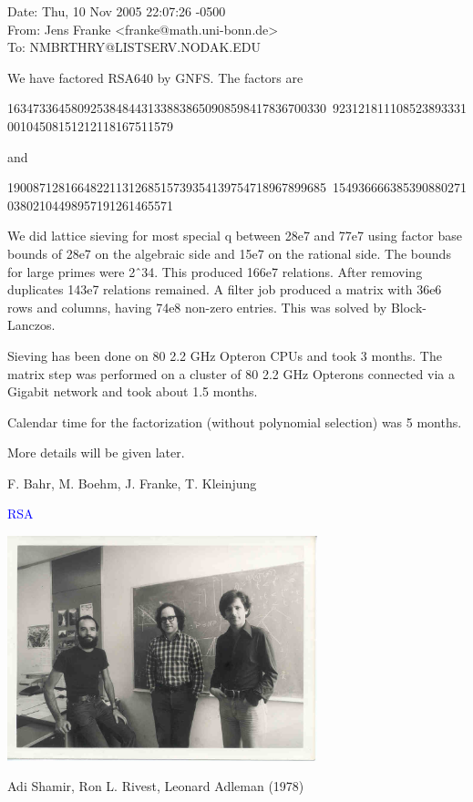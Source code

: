 \documentclass[landscape]{powersem} %
\newcommand{\psd}{\pause}%
\newcommand{\heading}[1]{%
 \begin{center}
  \large\bf
  \Ovalbox{{\textcolor{conceptcolor}{#1}}}%
 \end{center}
 \vspace{1ex minus 1ex}}
\begin{document}
\begin{slide}
\heading{Last Minute News}\vspace{-4mm}\psd
\begin{scriptsize}
\begin{tt}
\noindent
 Date: Thu, 10 Nov 2005 22:07:26 -0500\\
 From: Jens Franke <franke@math.uni-bonn.de>\\
 To: NMBRTHRY@LISTSERV.NODAK.EDU

We have factored RSA640 by GNFS. The factors are

16347336458092538484431338838650908598417836700330\
92312181110852389333100104508151212118167511579

and

19008712816648221131268515739354139754718967899685\
15493666638539088027103802104498957191261465571

We did lattice sieving for most special q between 28e7 and 77e7
using factor base bounds of 28e7 on the algebraic side and 15e7 on
the rational side. The bounds for large primes were 2\^\ 34. This
produced 166e7 relations. After removing duplicates 143e7 relations
remained. A filter job produced a matrix with 36e6 rows and columns,
having 74e8 non-zero entries. This was solved by Block-Lanczos.

Sieving has been done on 80 2.2 GHz Opteron CPUs and took 3 months.
The matrix step was performed on a cluster of 80 2.2 GHz Opterons
connected via a Gigabit network and took about 1.5 months.

Calendar time for the factorization (without polynomial selection)
was 5 months.

More details will be given later.

F. Bahr, M. Boehm, J. Franke, T. Kleinjung
\end{tt}\end{scriptsize}

\end{slide}

\begin{slide}

\centerline{\Large{\textcolor{blue}{RSA}}}

\centerline{\includegraphics[width=9cm]{images/rsa-photo.jpg}}

\centerline{Adi Shamir, Ron L. Rivest, Leonard Adleman (1978)}
\end{slide}
\end{document}
